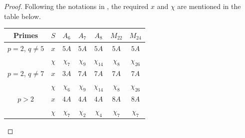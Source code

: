 \documentclass[11pt, a4paper]{article}
\numberwithin{equation}{section}
\theoremstyle{plain} %
\begin{document}
 
\begin{proof}  Following the notations in \cite{MR827219}, the required $x$ and $\chi$ are mentioned in the table below. 
%
\begin{center}
\begin{tabular}{|c|c|c|c|c|c|c|}\hline 
Primes & $S$  &  $A_6$ & $A_7$ & $A_8$ & $M_{22}$ & $M_{24}$ \\\hline 
$p=2$, $q\neq 5$  &$x$  & $5A$ & $5A$ & $5A$ & $5A$ & $5A$ \\
 & $\chi$ &  $\chi_7$ &$\chi_9$ & $\chi_{14}$ & $\chi_8$ & $\chi_{26}$ \\\hline 
 $p=2$, $q\neq 7$ & $x$ & $3A$ &$7A$ & $7A$ & $7A$ & $7A$ \\
 & $\chi$ & $\chi_6$ & $\chi_9$ & $\chi_{14}$ & $\chi_8$ & $\chi_{26}$ \\\hline
 $p>2$ & $x$ &$4A$ & $4A$ & $4A$ & $8A$ & $8A$\\
 & $\chi$ & $\chi_7$ &$\chi_2$ & $\chi_4$ & $\chi_7$ & $\chi_7$ \\\hline
 \end{tabular}
\end{center}
\end{proof}


 
\end{document}
